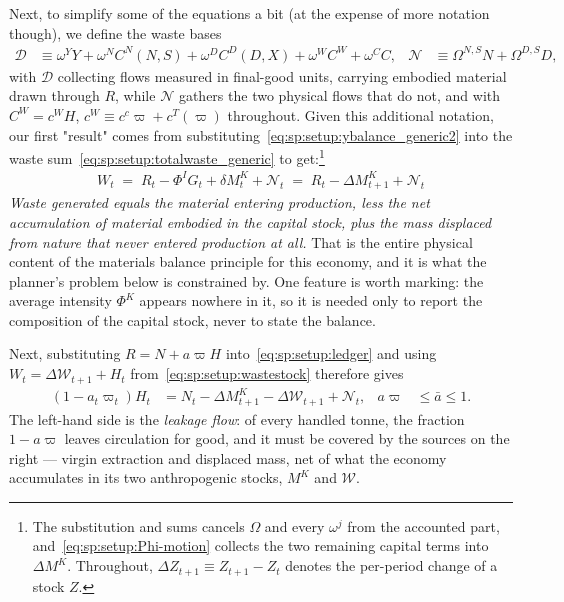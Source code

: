 Next, to simplify some of the equations a bit (at the expense of more notation though), we define the waste bases
\begin{align}
    \mathcal D &\equiv \omega^YY+\omega^{N}C^N(N,S)+\omega^{D}C^D(D,X)+\omega^WC^W+\omega^CC,
&
\mathcal N &\equiv \Omega^{N,S}N+\Omega^{D,S}D,
\label{eq:sp:setup:base}
\end{align}
with $\mathcal D$ collecting flows measured in final-good units, carrying embodied material drawn through $R$, while $\mathcal N$ gathers the two physical flows that do not, and with $C^W=c^WH$, $c^W\equiv c^c\varpi+c^T(\varpi)$ throughout. Given this additional notation, our first "result" comes from substituting~\eqref{eq:sp:setup:ybalance_generic2} into the waste sum~\eqref{eq:sp:setup:totalwaste_generic} to get:\footnote{The substitution and sums cancels $\Omega$ and every $\omega^j$ from the accounted part, and~\eqref{eq:sp:setup:Phi-motion} collects the two remaining capital terms into $\Delta M^K$. Throughout, $\Delta Z_{t+1}\equiv Z_{t+1}-Z_t$ denotes the per-period change of a stock $Z$.}
\begin{align}
\boxed{\;W_t \;=\; R_t-\Phi^IG_t+\delta M^K_t+\mathcal N_t \;=\; R_t-\Delta M^K_{t+1}+\mathcal N_t\;}
\label{eq:sp:setup:ledger}
\end{align}
\emph{Waste generated equals the material entering production, less the net accumulation of material embodied in the capital stock, plus the mass displaced from nature that never entered production at all.} That is the entire physical content of the materials balance principle for this economy, and it is what the planner's problem below is constrained by. One feature is worth marking: the average intensity $\Phi^K$ appears nowhere in it, so it is needed only to report the composition of the capital stock, never to state the balance.


Next, substituting $R=N+a\varpi H$ into~\eqref{eq:sp:setup:ledger} and using $W_t=\Delta\mathcal W_{t+1}+H_t$ from~\eqref{eq:sp:setup:wastestock} therefore gives
\begin{align}
\left(1-a_t\varpi_t\right)H_t &= N_t-\Delta M^K_{t+1}-\Delta\mathcal W_{t+1}+\mathcal N_t,
&
a\varpi&\le\bar a\le 1 .
\label{eq:sp:setup:ledger-collected}
\end{align}
The left-hand side is the \emph{leakage flow}: of every handled tonne, the fraction $1-a\varpi$ leaves circulation for good, and it must be covered by the sources on the right --- virgin extraction and displaced mass, net of what the economy accumulates in its two anthropogenic stocks, $M^K$ and $\mathcal W$.

